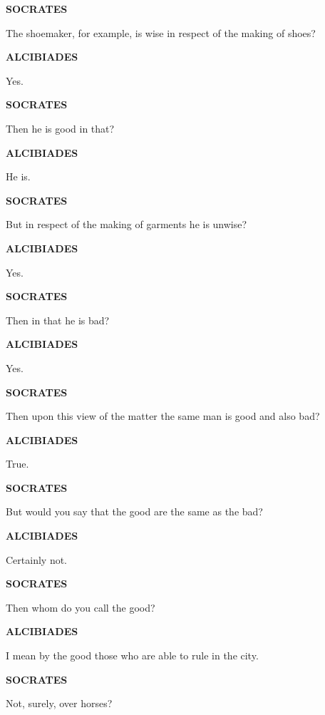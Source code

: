 \documentclass[11pt,letter]{article}
\begin{document}
\par \textbf{SOCRATES}
\par   The shoemaker, for example, is wise in respect of the making of shoes?

\par \textbf{ALCIBIADES}
\par   Yes.

\par \textbf{SOCRATES}
\par   Then he is good in that?

\par \textbf{ALCIBIADES}
\par   He is.

\par \textbf{SOCRATES}
\par   But in respect of the making of garments he is unwise?

\par \textbf{ALCIBIADES}
\par   Yes.

\par \textbf{SOCRATES}
\par   Then in that he is bad?

\par \textbf{ALCIBIADES}
\par   Yes.

\par \textbf{SOCRATES}
\par   Then upon this view of the matter the same man is good and also bad?

\par \textbf{ALCIBIADES}
\par   True.

\par \textbf{SOCRATES}
\par   But would you say that the good are the same as the bad?

\par \textbf{ALCIBIADES}
\par   Certainly not.

\par \textbf{SOCRATES}
\par   Then whom do you call the good?

\par \textbf{ALCIBIADES}
\par   I mean by the good those who are able to rule in the city.

\par \textbf{SOCRATES}
\par   Not, surely, over horses?
\end{document}
